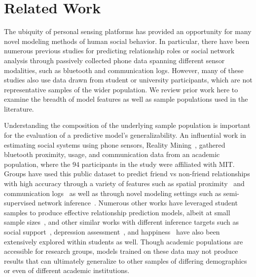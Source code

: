 \documentclass[acmlarge]{acmart}
\begin{document}

\section{Related Work}
\label{sec:related_work}


The ubiquity of personal sensing platforms has provided an opportunity for many novel modeling methods of human social behavior. In particular, there have been numerous previous studies for predicting relationship roles or social network analysis through passively collected phone data spanning different sensor modalities, such as bluetooth and communication logs. However, many of these studies also use data drawn from student or university participants, which are not representative samples of the wider population. We review prior work here to examine the breadth of model features as well as sample populations used in the literature.

Understanding the composition of the underlying sample population is important for the evaluation of a predictive model's generalizability. An influential work in estimating social systems using phone sensors, Reality Mining~\cite{eagle2006reality}, gathered bluetooth proximity, usage, and communication data from an academic population, where the 94 participants in the study were affiliated with MIT. Groups have used this public dataset to predict friend vs non-friend relationships with high accuracy through a variety of features such as spatial proximity~\cite{eagle2009inferring} and communication logs~\cite{mirisaee2010mining} as well as through novel modeling settings such as semi-supervised network inference~\cite{yu2017semi}. Numerous other works have leveraged student samples to produce effective relationship prediction models, albeit at small sample sizes~\cite{reinhardt2015show,hsieh2014inferring,dwarakanath2016analyzing}, and other similar works with different inference targets such as social support~\cite{ghosh2018modeling}, depression assessment~\cite{lu2018joint}, and happiness~\cite{jaques2015predicting} have also been extensively explored within students as well. Though academic populations are accessible for research groups, models trained on these data may not produce results that can ultimately generalize to other samples of differing demographics or even of different academic institutions.
\end{document}
